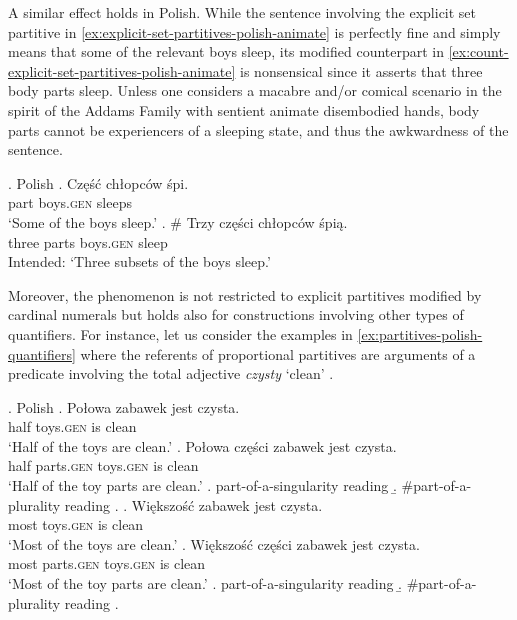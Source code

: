 A similar effect holds in Polish. While the sentence involving the explicit set partitive in \ref{ex:explicit-set-partitives-polish-animate} is perfectly fine and simply means that some of the relevant boys sleep, its modified counterpart in \ref{ex:count-explicit-set-partitives-polish-animate} is nonsensical since it asserts that three body parts sleep. Unless one considers a macabre and/or comical scenario in the spirit of the Addams Family with sentient animate disembodied hands, body parts cannot be experiencers of a sleeping state, and thus the awkwardness of the sentence.\largerpage

		\ex.\label{ex:count-explicit-partitives-polish-animate} Polish
        \ag. Część chłopców śpi.\label{ex:explicit-set-partitives-polish-animate}\\
		part boys\textsc{.gen} sleeps\\
		`Some of the boys sleep.'
		\bg. \# Trzy części chłopców śpią.\label{ex:count-explicit-set-partitives-polish-animate}\\
		three parts boys\textsc{.gen} sleep\\
		Intended: `Three subsets of the boys sleep.'

Moreover, the phenomenon is not restricted to explicit partitives modified by cardinal numerals but holds also for constructions involving other types of quantifiers. For instance, let us consider the examples in \ref{ex:partitives-polish-quantifiers} where the referents of proportional partitives are arguments of a predicate involving the total adjective \textit{czysty} `clean' \citep{yoon1996total,rotstein_winter2004total}. 

\ex.\label{ex:partitives-polish-quantifiers} Polish
\ag. Połowa zabawek jest czysta.\label{ex:proportional-partitives-polish-half}\\
half toys\textsc{.gen} is clean\\
`Half of the toys are clean.'
\bg. Połowa części zabawek jest czysta.\label{ex:proportional-explicit-partitives-polish-half}\\
half parts\textsc{.gen} toys\textsc{.gen} is clean\\
`Half of the toy parts are clean.'
\a. part-of-a-singularity reading
\b. \#part-of-a-plurality reading
\z.
\bg. Większość zabawek jest czysta.\label{ex:proportional-partitives-polish-most}\\
most toys\textsc{.gen} is clean\\
`Most of the toys are clean.'
\bg. Większość części zabawek jest czysta.\label{ex:proportional-explicit-partitives-polish-most}\\
most parts\textsc{.gen} toys\textsc{.gen} is clean\\
`Most of the toy parts are clean.'
\a. part-of-a-singularity reading
\b. \#part-of-a-plurality reading
\z.

